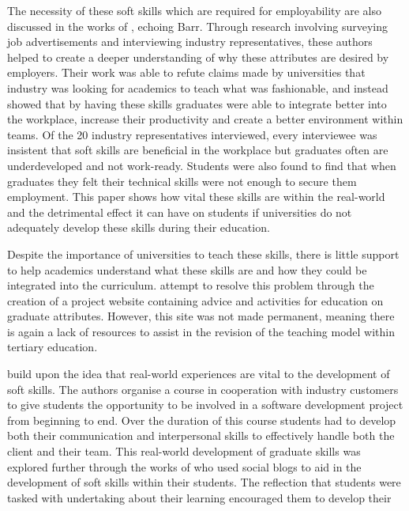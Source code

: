 \documentclass{l4proj}
\begin{document}
The necessity of these soft skills which are required for employability are also discussed in 
the works of \citet{stevens_industry_2016}, echoing Barr. Through research involving surveying job 
advertisements and interviewing industry representatives, these authors helped to create a deeper 
understanding of why these attributes are desired by employers. Their work was able to refute 
claims made by universities that industry was looking for academics to teach what was fashionable, 
and instead showed that by having these skills graduates were able to integrate better into the 
workplace, increase their productivity and create a better environment within teams.  Of the 20 
industry representatives interviewed, every interviewee was insistent that soft skills are 
beneficial in the workplace but graduates often are underdeveloped and not work-ready. Students 
were also found to find that when graduates they felt their technical skills were not enough to 
secure them employment. This paper shows how vital these skills are within the real-world and the 
detrimental effect it can have on students if universities do not adequately develop these skills 
during their education.
\par 
Despite the importance of universities to teach these skills, there is little support to 
help academics understand what these skills are and how they could be integrated into the curriculum.
\citet{litchfield_contextualising_2010} attempt to resolve this problem through the creation of a project website 
containing advice and activities for education on graduate attributes. However, this site was not 
made permanent, meaning there is again a lack of resources to assist in the revision of the 
teaching model within tertiary education.
\par 
\citet{abernethy_teaching_2009} build upon the idea that real-world experiences are vital to the 
development of soft skills. The authors organise a course in cooperation with industry customers 
to give students the opportunity to be involved in a software development project from beginning 
to end. Over the duration of this course students had to develop both their communication and 
interpersonal skills to effectively handle both the client and their team. This real-world 
development of graduate skills was explored further through the works of \citet{mcdermott_developing_nodate} who 
used social blogs to aid in the development of soft skills within their students. The reflection 
that students were tasked with undertaking about their learning encouraged them to develop their 
\end{document}
